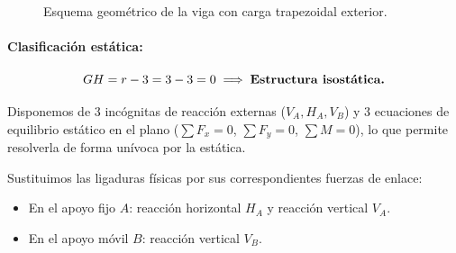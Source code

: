 \begin{figure}[H]
{%

    }

    \caption{Esquema geométrico de la viga con carga trapezoidal exterior.}

    \label{fig:ejemplo4_esquema}

\end{figure}



\paragraph{Clasificación estática:}

\begin{equation}

    GH = r - 3 = 3 - 3 = 0 \implies \text{\textbf{Estructura isostática.}}

\end{equation}

Disponemos de 3 incógnitas de reacción externas ($V_A, H_A, V_B$) y 3 ecuaciones de equilibrio estático en el plano ($\sum F_x = 0$, $\sum F_y = 0$, $\sum M = 0$), lo que permite resolverla de forma unívoca por la estática.






Sustituimos las ligaduras físicas por sus correspondientes fuerzas de enlace:

\begin{itemize}

    \item En el apoyo fijo $A$: reacción horizontal $H_A$ y reacción vertical $V_A$.

    \item En el apoyo móvil $B$: reacción vertical $V_B$.

\end{itemize}



